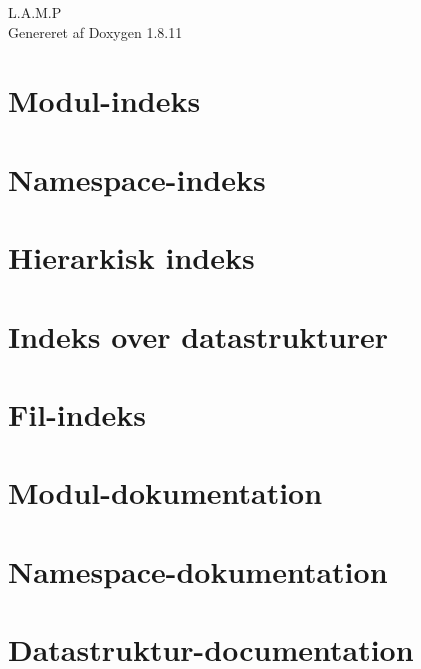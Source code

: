 \documentclass[twoside]{article}
\newcommand{\+}{\discretionary{\mbox{\scriptsize$\hookleftarrow$}}{}{}}
\begin{document}
\hypersetup{pageanchor=false,
             bookmarksnumbered=true,
             pdfencoding=unicode
            }
\begin{titlepage}
\vspace*{7cm}
\begin{center}%
{\Large L.\+A.\+M.\+P }\\
\vspace*{1cm}
{\large Genereret af Doxygen 1.8.11}\\
\end{center}
\end{titlepage}
\tableofcontents
{}
\hypersetup{pageanchor=true}

\section{Modul-\/indeks}

\section{Namespace-\/indeks}

\section{Hierarkisk indeks}

\section{Indeks over datastrukturer}

\section{Fil-\/indeks}

\section{Modul-\/dokumentation}

\section{Namespace-\/dokumentation}

\section{Datastruktur-\/documentation}















\end{document}
